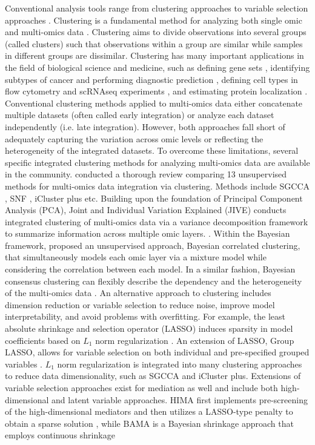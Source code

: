 Conventional analysis tools range from clustering approaches to variable selection approaches \citep{gonzalez2019omic}. Clustering is a fundamental method for analyzing both single omic and multi-omics data \citep{rappoport2018multi}. Clustering aims to divide observations into several groups (called clusters) such that observations within a group are similar while samples in different groups are dissimilar. Clustering has many important applications in the field of biological science and medicine, such as defining gene sets \citep{hejblum2015time}, identifying subtypes of cancer and performing diagnostic prediction \citep{curtis2012genomic, khan2001classification}, defining cell types in flow cytometry and scRNAseq experiments \citep{chan2008statistical, hejblum2019sequential, prabhakaran2016dirichlet}, and estimating protein localization \citep{crook2018bayesian}. Conventional clustering methods applied to multi-omics data either concatenate multiple datasets (often called early integration) or analyze each dataset independently (i.e. late integration). However, both approaches fall short of adequately capturing the variation across omic levels or reflecting the heterogeneity of the integrated datasets. To overcome these limitations, several specific integrated clustering methods for analyzing multi-omics data are available in the community. \citet{pierre2020clustering} conducted a thorough review comparing 13 unsupervised methods for multi-omics data integration via clustering. Methods include SGCCA \citep{tenenhaus2014variable}, SNF \citep{wang2014similarity}, iCluster plus \citep{mo2013pattern} etc. Building upon the foundation of Principal Component Analysis (PCA), Joint and Individual Variation Explained (JIVE) conducts integrated clustering of multi-omics data via a variance decomposition framework to summarize information across multiple omic layers. \citep{lock2013joint}. Within the Bayesian framework, \citet{kirk2012bayesian} proposed an unsupervised approach, Bayesian correlated clustering, that simultaneously models each omic layer via a mixture model while considering the correlation between each model. In a similar fashion, Bayesian consensus clustering can flexibly describe the dependency and the heterogeneity of the multi-omics data \citep{lock2013bayesian}. An alternative approach to clustering includes dimension reduction or variable selection to reduce noise, improve model interpretability, and avoid problems with overfitting. For example, the least absolute shrinkage and selection operator (LASSO) induces sparsity in model coefficients based on $L_1$ norm regularization \citep{tibshirani1996regression}. An extension of LASSO, Group LASSO, allows for variable selection on both individual and pre-specified grouped variables \citep{yuan2006model}. $L_1$ norm regularization is integrated into many clustering approaches to reduce data dimensionality, such as SGCCA and iCluster plus. Extensions of variable selection approaches exist for mediation as well and include both high-dimensional and latent variable approaches. HIMA first implements pre-screening of the high-dimensional mediators and then utilizes a LASSO-type penalty to obtain a sparse solution \citep{zhang2016estimating}, while BAMA is a Bayesian shrinkage approach that employs continuous shrinkage 